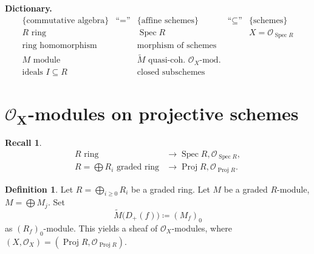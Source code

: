 \documentclass[12pt]{article}
\DeclareMathOperator{\Spec}{Spec}
\DeclareMathOperator{\Proj}{Proj}
\theoremstyle{definition}
\newtheorem*{definition}{Definition}
\newtheorem*{recall}{Recall}
\theoremstyle{remark}
\begin{document}
\textbf{Dictionary.}
\[
\begin{array}{ccccc}
\{\text{commutative algebra}\}&\text{``}=\text{''}&\{\text{affine schemes}\}&\text{``}\subseteq\text{''}&\{\text{schemes}\}\\
R\text{ ring}&&\Spec R&&X=\mathcal{O}_{\Spec R}\\
\text{ring homomorphism}&&\text{morphism of schemes}\\
M\text{ module}&&\widetilde{M}\text{ quasi-coh. }\mathcal{O}_X\text{-mod.}\\
\text{ideals }I\subseteq R&&\text{closed subschemes}
\end{array}
\]

\section{\texorpdfstring{$\boldsymbol{\mathcal{O}_X}$-m}{M}odules on projective schemes}

\begin{recall}
\begin{align*}
R\text{ ring}&\longrightarrow\Spec R,\mathcal{O}_{\Spec R},\\
R=\bigoplus R_i\text{ graded ring}&\longrightarrow\Proj R,\mathcal{O}_{\Proj R}.
\end{align*}
\end{recall}

\begin{definition}
Let $R=\bigoplus_{i\geq0}R_i$ be a graded ring. Let $M$ be a graded $R$-module, $M=\bigoplus M_j$. Set
\[\widetilde{M}\big(D_+(f)\big)\coloneqq(M_f)_0\]
as $(R_f)_0$-module. This yields a sheaf of $\mathcal{O}_X$-modules, where $(X,\mathcal{O}_X)=(\Proj R,\mathcal{O}_{\Proj R})$.
\end{definition}
\end{document}
